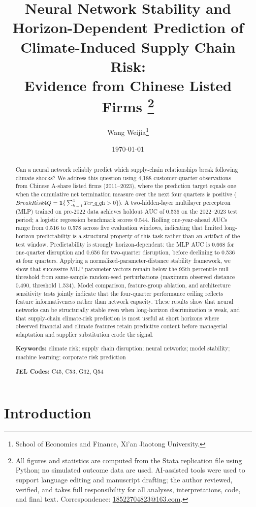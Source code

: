 \documentclass[12pt]{article}
\title{\textbf{Neural Network Stability and Horizon-Dependent Prediction
of Climate-Induced Supply Chain Risk:\\[4pt]
Evidence from Chinese Listed Firms}%
\thanks{All figures and statistics are computed from the Stata replication
file using Python; no simulated outcome data are used.
AI-assisted tools were used to support language editing and manuscript
drafting; the author reviewed, verified, and takes full responsibility
for all analyses, interpretations, code, and final text.
Correspondence: \href{mailto:18522704823@163.com}{18522704823@163.com}.}}
\author{Wang Weijia\thanks{School of Economics and Finance,
Xi'an Jiaotong University.}}
\date{\today}
\begin{document}
\maketitle

\begin{abstract}
\noindent
Can a neural network reliably predict which supply-chain relationships
break following climate shocks?  We address this question using 4,188
customer-quarter observations from Chinese A-share listed firms (2011--2023),
where the prediction target equals one when the cumulative net
termination measure over the next four quarters is positive
($\textit{BreakRisk4Q} = \mathbf{1}\!\{\sum_{h=1}^{4}\textit{Ter\_q\_qh}>0\}$).
A two-hidden-layer multilayer perceptron (MLP) trained on pre-2022 data
achieves holdout AUC of 0.536 on the 2022--2023 test period; a logistic
regression benchmark scores 0.544.  Rolling one-year-ahead AUCs range from
0.516 to 0.578 across five evaluation windows, indicating that limited
long-horizon predictability is a structural property of this task rather
than an artifact of the test window.  Predictability is strongly
horizon-dependent: the MLP AUC is 0.668 for one-quarter disruption and
0.656 for two-quarter disruption, before declining to 0.536 at four
quarters.  Applying a normalized-parameter-distance stability framework, we
show that successive MLP parameter vectors remain below the 95th-percentile
null threshold from same-sample random-seed perturbations (maximum observed
distance 0.490, threshold 1.534).  Model comparison, feature-group ablation,
and architecture sensitivity tests jointly indicate that the four-quarter
performance ceiling reflects feature informativeness rather than network
capacity.  These results show that neural networks can be structurally stable
even when long-horizon discrimination is weak, and that supply-chain
climate-risk prediction is most useful at short horizons where observed
financial and climate features retain predictive content before managerial
adaptation and supplier substitution erode the signal.

\medskip\noindent
\textbf{Keywords:} climate risk; supply chain disruption; neural networks;
model stability; machine learning; corporate risk prediction

\medskip\noindent
\textbf{JEL Codes:} C45, C53, G32, Q54
\end{abstract}

\newpage

\section{Introduction}
\end{document}
